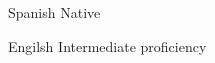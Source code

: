 


\begin{cvskills}


\cvskill
{Spanish} %
{Native} %


\cvskill
{Engilsh} %
{Intermediate proficiency} %


\end{cvskills}